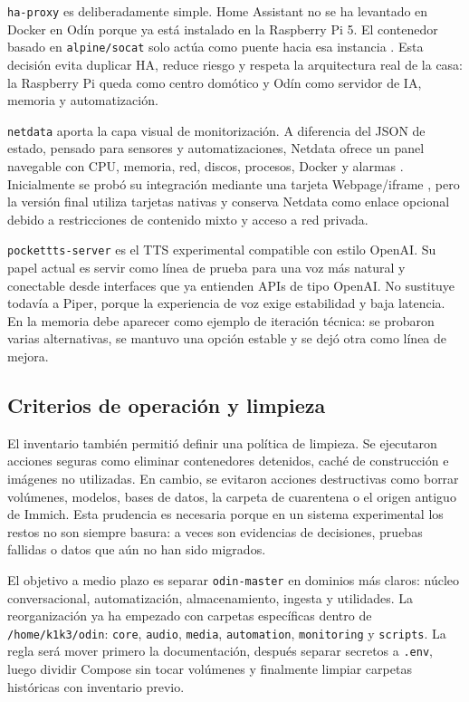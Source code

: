 \texttt{ha-proxy} es deliberadamente simple. Home Assistant no se ha levantado en Docker en Odín porque ya está instalado en la Raspberry Pi 5. El contenedor basado en \texttt{alpine/socat} solo actúa como puente hacia esa instancia \citep{alpineSocatDockerHub,homeAssistantDocs}. Esta decisión evita duplicar HA, reduce riesgo y respeta la arquitectura real de la casa: la Raspberry Pi queda como centro domótico y Odín como servidor de IA, memoria y automatización.

\texttt{netdata} aporta la capa visual de monitorización. A diferencia del JSON de estado, pensado para sensores y automatizaciones, Netdata ofrece un panel navegable con CPU, memoria, red, discos, procesos, Docker y alarmas \citep{netdataDockerInstall}. Inicialmente se probó su integración mediante una tarjeta Webpage/iframe \citep{homeAssistantIframeCard}, pero la versión final utiliza tarjetas nativas y conserva Netdata como enlace opcional debido a restricciones de contenido mixto y acceso a red privada.

\texttt{pockettts-server} es el TTS experimental compatible con estilo OpenAI. Su papel actual es servir como línea de prueba para una voz más natural y conectable desde interfaces que ya entienden APIs de tipo OpenAI. No sustituye todavía a Piper, porque la experiencia de voz exige estabilidad y baja latencia. En la memoria debe aparecer como ejemplo de iteración técnica: se probaron varias alternativas, se mantuvo una opción estable y se dejó otra como línea de mejora.

\subsection{Criterios de operación y limpieza}
El inventario también permitió definir una política de limpieza. Se ejecutaron acciones seguras como eliminar contenedores detenidos, caché de construcción e imágenes no utilizadas. En cambio, se evitaron acciones destructivas como borrar volúmenes, modelos, bases de datos, la carpeta de cuarentena o el origen antiguo de Immich. Esta prudencia es necesaria porque en un sistema experimental los restos no son siempre basura: a veces son evidencias de decisiones, pruebas fallidas o datos que aún no han sido migrados.

El objetivo a medio plazo es separar \texttt{odin-master} en dominios más claros: núcleo conversacional, automatización, almacenamiento, ingesta y utilidades. La reorganización ya ha empezado con carpetas específicas dentro de \nolinkurl{/home/k1k3/odin}: \texttt{core}, \texttt{audio}, \texttt{media}, \texttt{automation}, \texttt{monitoring} y \texttt{scripts}. La regla será mover primero la documentación, después separar secretos a \texttt{.env}, luego dividir Compose sin tocar volúmenes y finalmente limpiar carpetas históricas con inventario previo.


